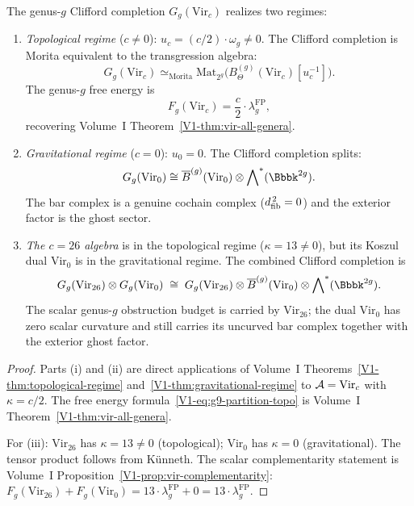 \begin{theorem}
The genus-$g$ Clifford completion $G_g(\mathrm{Vir}_c)$ realizes two
regimes:

\begin{enumerate}[label=\textup{(\roman*)}]
\item \emph{Topological regime} ($c \neq 0$):\;
$u_c = (c/2) \cdot \omega_g \neq 0$. The Clifford completion is
Morita equivalent to the transgression algebra:
\[
G_g(\mathrm{Vir}_c)
\simeq_{\mathrm{Morita}}
\mathrm{Mat}_{2^g}\bigl(B_\Theta^{(g)}(\mathrm{Vir}_c)[u_c^{-1}]\bigr).
\]
The genus-$g$ free energy is
\begin{equation}%
F_g(\mathrm{Vir}_c)
= \frac{c}{2} \cdot \lambda_g^{\mathrm{FP}},
\end{equation}
recovering Volume~I Theorem~\ref{V1-thm:vir-all-genera}.

\item \emph{Gravitational regime} ($c = 0$):\;
$u_0 = 0$. The Clifford completion splits:
\[
G_g(\mathrm{Vir}_0)
\cong
\barB^{(g)}(\mathrm{Vir}_0)
\otimes \bigwedge\nolimits^*(\Bbbk^{2g}).
\]
The bar complex is a genuine cochain complex ($d_{\mathrm{fib}}^{\,2} = 0$)
and the exterior factor is the ghost sector.

\item \emph{The $c = 26$ algebra}\/ is in the topological regime
($\kappa = 13 \neq 0$), but its Koszul dual $\mathrm{Vir}_0$ is in
the gravitational regime. The combined Clifford completion is
\begin{equation}%
G_g(\mathrm{Vir}_{26}) \otimes G_g(\mathrm{Vir}_0)
\;\cong\;
G_g(\mathrm{Vir}_{26})
\otimes \barB^{(g)}(\mathrm{Vir}_0)
\otimes \bigwedge\nolimits^*(\Bbbk^{2g}).
\end{equation}
The scalar genus-$g$ obstruction budget is carried by
$\mathrm{Vir}_{26}$; the dual $\mathrm{Vir}_0$ has zero scalar
curvature and still carries its uncurved bar complex together with
the exterior ghost factor.
\end{enumerate}
\end{theorem}

\begin{proof}
Parts (i) and (ii) are direct applications of
Volume~I Theorems~\ref{V1-thm:topological-regime}
and~\ref{V1-thm:gravitational-regime} to $\mathcal{A} = \mathrm{Vir}_c$ with
$\kappa = c/2$. The free energy
formula~\eqref{V1-eq:g9-partition-topo} is Volume~I Theorem~\ref{V1-thm:vir-all-genera}.

For (iii): $\mathrm{Vir}_{26}$ has $\kappa = 13 \neq 0$
(topological); $\mathrm{Vir}_0$ has $\kappa = 0$ (gravitational).
The tensor product follows from K\"unneth. The
scalar complementarity statement is
Volume~I Proposition~\ref{V1-prop:vir-complementarity}: $F_g(\mathrm{Vir}_{26}) +
F_g(\mathrm{Vir}_0) = 13 \cdot \lambda_g^{\mathrm{FP}} + 0 =
13 \cdot \lambda_g^{\mathrm{FP}}$.
\end{proof}

